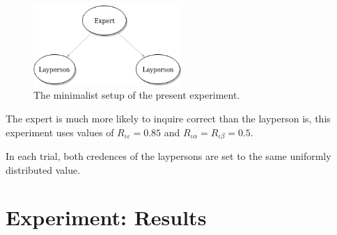 \documentclass[11pt, a4paper]{article}
\renewcommand{\a}{\alpha}
\begin{document}
\begin{figure}[ht]
	\centering
    \includegraphics[width=0.5\textwidth]{Expert_Layperson.png}
	\caption{The minimalist setup of the present experiment.\label{fig:el}}
\end{figure}

The expert is much more likely to inquire correct than the layperson is, this experiment uses values of $R_{\iota\varepsilon} = 0.85$ and $R_{\iota\a} = R_{\iota\beta} = 0.5$.

In each trial, both credences of the laypersons are set to the same uniformly distributed value.

\section{Experiment: Results}

\nocite{*}
\printbibliography{}
\end{document}
